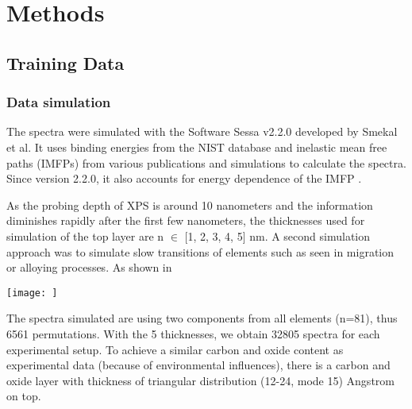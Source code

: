 


\chapter{Methods} %

\label{Chapter3} %


\section{Training Data}



\subsection{Data simulation}

The spectra were simulated with the Software Sessa v2.2.0 developed by Smekal et al. It uses binding energies from the NIST database and inelastic mean free paths (IMFPs) from various publications and simulations to calculate the spectra. Since version 2.2.0, it also accounts for energy dependence of the IMFP \cite{noauthor_nist_2010}.

As the probing depth of XPS is around 10 nanometers and the information diminishes rapidly after the first few nanometers, the thicknesses used for simulation of the top layer are n $\in$ [1, 2, 3, 4, 5] nm. A second simulation approach was to simulate slow transitions of elements such as seen in migration or alloying processes. As shown in 

\texttt{[image: ]}

The spectra simulated are using two components from all elements (n=81), thus 6561 permutations. With the 5 thicknesses, we obtain 32805 spectra for each experimental setup. To achieve a similar carbon and oxide content as experimental data (because of environmental influences), there is a carbon and oxide layer with thickness of triangular distribution (12-24, mode 15) Angstrom on top. 


